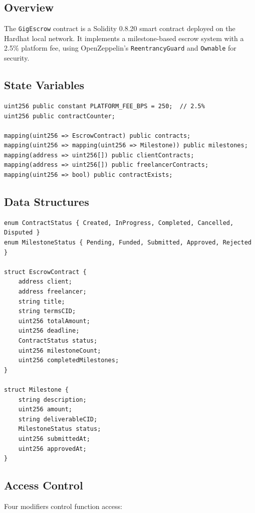 \documentclass[12pt,a4paper]{article}
\begin{document}
\subsection{Overview}
The \texttt{GigEscrow} contract is a Solidity 0.8.20 smart contract deployed on the Hardhat local network. It implements a milestone-based escrow system with a 2.5\% platform fee, using OpenZeppelin's \texttt{ReentrancyGuard} and \texttt{Ownable} for security.

\subsection{State Variables}

\begin{lstlisting}[style=soliditystyle]
uint256 public constant PLATFORM_FEE_BPS = 250;  // 2.5%
uint256 public contractCounter;

mapping(uint256 => EscrowContract) public contracts;
mapping(uint256 => mapping(uint256 => Milestone)) public milestones;
mapping(address => uint256[]) public clientContracts;
mapping(address => uint256[]) public freelancerContracts;
mapping(uint256 => bool) public contractExists;
\end{lstlisting}

\subsection{Data Structures}

\begin{lstlisting}[style=soliditystyle]
enum ContractStatus { Created, InProgress, Completed, Cancelled, Disputed }
enum MilestoneStatus { Pending, Funded, Submitted, Approved, Rejected }

struct EscrowContract {
    address client;
    address freelancer;
    string title;
    string termsCID;
    uint256 totalAmount;
    uint256 deadline;
    ContractStatus status;
    uint256 milestoneCount;
    uint256 completedMilestones;
}

struct Milestone {
    string description;
    uint256 amount;
    string deliverableCID;
    MilestoneStatus status;
    uint256 submittedAt;
    uint256 approvedAt;
}
\end{lstlisting}

\subsection{Access Control}

Four modifiers control function access:
\end{document}
